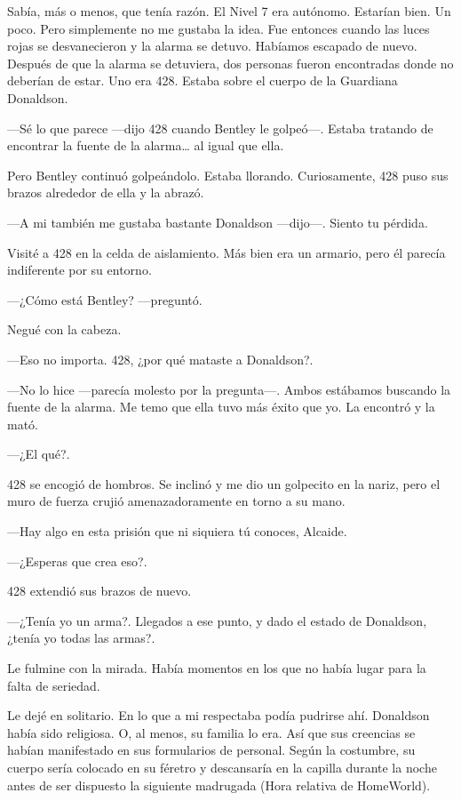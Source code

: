 Sabía, más o menos, que tenía razón. El Nivel 7 era autónomo. Estarían
bien. Un poco. Pero simplemente no me gustaba la idea. Fue entonces
cuando las luces rojas se desvanecieron y la alarma se detuvo. Habíamos
escapado de nuevo. Después de que la alarma se detuviera, dos personas
fueron encontradas donde no deberían de estar. Uno era 428. Estaba sobre
el cuerpo de la Guardiana Donaldson.

---Sé lo que parece ---dijo 428 cuando Bentley le golpeó---. Estaba
tratando de encontrar la fuente de la alarma\ldots{} al igual que ella.

Pero Bentley continuó golpeándolo. Estaba llorando. Curiosamente, 428
puso sus brazos alrededor de ella y la abrazó.

---A mi también me gustaba bastante Donaldson ---dijo---. Siento tu
pérdida.

Visité a 428 en la celda de aislamiento. Más bien era un armario, pero
él parecía indiferente por su entorno.

---¿Cómo está Bentley? ---preguntó.

Negué con la cabeza.

---Eso no importa. 428, ¿por qué mataste a Donaldson?.

---No lo hice ---parecía molesto por la pregunta---. Ambos estábamos
buscando la fuente de la alarma. Me temo que ella tuvo más éxito que yo.
La encontró y la mató.

---¿El qué?.

428 se encogió de hombros. Se inclinó y me dio un golpecito en la nariz,
pero el muro de fuerza crujió amenazadoramente en torno a su mano.

---Hay algo en esta prisión que ni siquiera tú conoces, Alcaide.

---¿Esperas que crea eso?.

428 extendió sus brazos de nuevo.

---¿Tenía yo un arma?. Llegados a ese punto, y dado el estado de
Donaldson, ¿tenía yo todas las armas?.

Le fulmine con la mirada. Había momentos en los que no había lugar para
la falta de seriedad.

Le dejé en solitario. En lo que a mi respectaba podía pudrirse ahí.
Donaldson había sido religiosa. O, al menos, su familia lo era. Así que
sus creencias se habían manifestado en sus formularios de personal.
Según la costumbre, su cuerpo sería colocado en su féretro y descansaría
en la capilla durante la noche antes de ser dispuesto la siguiente
madrugada (Hora relativa de HomeWorld).

